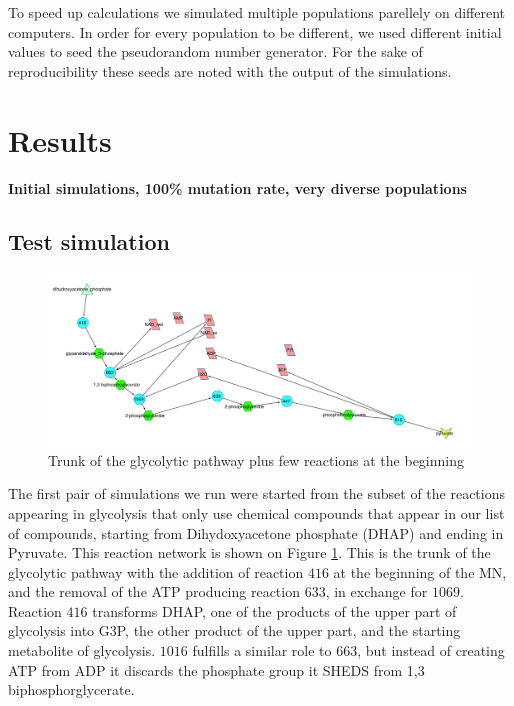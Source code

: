 \documentclass[10pt,a4paper]{article}
\begin{document}
	To speed up calculations we simulated multiple populations parellely on different computers. In order for every population to be different, we used different initial values to seed the pseudorandom number generator. For the sake of reproducibility these seeds are noted with the output of the simulations. 


\section{Results}
\label{sec:results}

\textbf{Initial simulations, 100\% mutation rate, very diverse populations}

\subsection{Test simulation}
\label{sub:test_simulation}

\begin{figure}[htpb]
	\centering
	\includegraphics[width=1\linewidth]{trunk_glyc_init.pdf}
	\caption{Trunk of the glycolytic pathway plus few reactions at the beginning}
	\label{fig:truncglycinit}
\end{figure}

The first pair of simulations we run were started from the subset of the reactions appearing in glycolysis that only use chemical compounds that appear in our list of compounds, starting from Dihydoxyacetone phosphate (DHAP) and ending in Pyruvate. This reaction network is shown on Figure \ref{fig:truncglycinit}. This is the trunk of the glycolytic pathway with the addition of reaction $416$ at the beginning of the MN, and the removal of the ATP producing reaction $633$, in exchange for $1069$. Reaction $416$ transforms DHAP, one of the products of the upper part of glycolysis into G3P, the other product of the upper part, and the starting metabolite of glycolysis. $1016$ fulfills a similar role to $663$, but instead of creating ATP from ADP it discards the phosphate group it SHEDS from 1,3 biphosphorglycerate.
\end{document}

